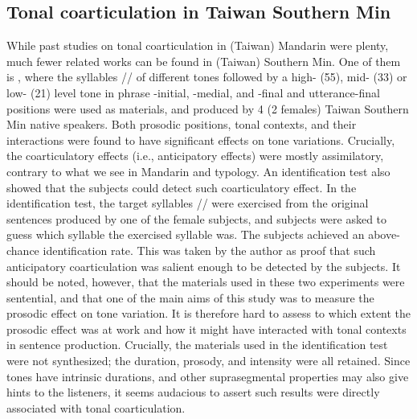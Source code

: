 \documentclass[12pt]{report}
\newcommand{\tip}{\textipa}
\begin{document}
\begin{CJK}{UTF8}{bsmi}
\section{Tonal coarticulation in Taiwan Southern Min}
While past studies on tonal coarticulation in (Taiwan) Mandarin were plenty, much fewer related works can be found in (Taiwan) Southern Min. One of them is \cite{Peng1997}, where the syllables /\tip{kaw}/ of different tones followed by a high- (55), mid- (33) or low- (21) level tone in phrase -initial, -medial, and -final and utterance-final positions were used as materials, and produced by 4 (2 females) Taiwan Southern Min native speakers. Both prosodic positions, tonal contexts, and their interactions were found to have significant effects on tone variations. Crucially, the coarticulatory effects (i.e., anticipatory effects) were mostly assimilatory, contrary to what we see in Mandarin and typology. An identification test also showed that the subjects could detect such coarticulatory effect. In the identification test, the target syllables /\tip{kau}/ were exercised from the original sentences produced by one of the female subjects, and subjects were asked to guess which syllable the exercised syllable was. The subjects achieved an above-chance identification rate. This was taken by the author as proof that such anticipatory coarticulation was salient enough to be detected by the subjects. It should be noted, however, that  the materials used in these two experiments were sentential, and that one of the main aims of this study was to measure the prosodic effect on tone variation. It is therefore hard to assess to which extent the prosodic effect was at work and how it might have interacted with tonal contexts in sentence production. Crucially, the materials used in the identification test were not synthesized; the duration, prosody, and intensity were all retained. Since tones have intrinsic durations, and other suprasegmental properties may also give hints to the listeners, it seems audacious to assert such results were directly associated with tonal coarticulation.


\end{CJK}
\end{document}
